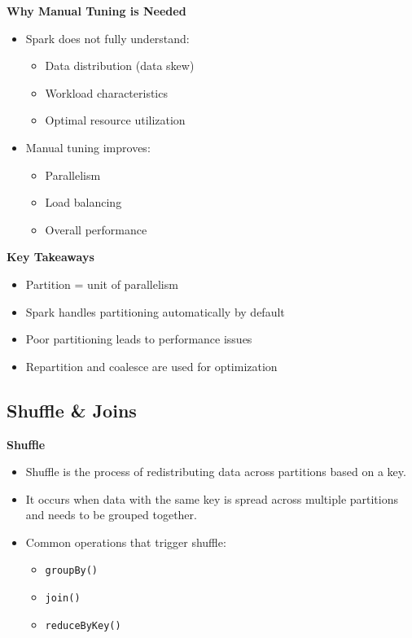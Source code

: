 \documentclass[10pt,a4paper]{article}
\begin{document}
	\textbf{Why Manual Tuning is Needed}
	\begin{itemize}
	    \item Spark does not fully understand:
	    \begin{itemize}
	        \item Data distribution (data skew)
	        \item Workload characteristics
	        \item Optimal resource utilization
	    \end{itemize}
	    \item Manual tuning improves:
	    \begin{itemize}
	        \item Parallelism
	        \item Load balancing
	        \item Overall performance
	    \end{itemize}
	\end{itemize}
	
	\textbf{Key Takeaways}
	\begin{itemize}
	    \item Partition = unit of parallelism
	    \item Spark handles partitioning automatically by default
	    \item Poor partitioning leads to performance issues
	    \item Repartition and coalesce are used for optimization
	\end{itemize}
	
	
	\subsection{Shuffle \& Joins}
	
	\textbf{Shuffle}
	\begin{itemize}
	    \item Shuffle is the process of redistributing data across partitions based on a key.
	    \item It occurs when data with the same key is spread across multiple partitions and needs to be grouped together.
	    \item Common operations that trigger shuffle:
	    \begin{itemize}
	        \item \texttt{groupBy()}
	        \item \texttt{join()}
	        \item \texttt{reduceByKey()}
	    \end{itemize}
	\end{itemize}
	
\end{document}
